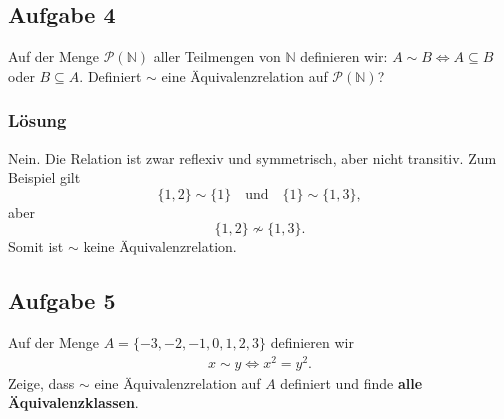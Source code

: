 \documentclass[a4paper,10pt]{article}
\newcommand{\N}{\mathbb{N}}
\newcommand{\s}[1]{#1}
\begin{document}
\subsection*{Aufgabe 4}

Auf der Menge $\mathcal{P}(\N)$ aller Teilmengen von $\N$ definieren wir: $A\sim B\iff A\subseteq B$ oder $B\subseteq A$. Definiert $\sim$ eine Äquivalenzrelation auf $\mathcal{P}(\N)$?

\s{\subsubsection*{Lösung}
    Nein. Die Relation ist zwar reflexiv und symmetrisch, aber nicht transitiv.
    Zum Beispiel gilt
    \[
    \{1,2\}\sim\{1\}
    \quad\text{und}\quad
    \{1\}\sim\{1,3\},
    \]
    aber
    \[
    \{1,2\}\not\sim\{1,3\}.
    \]
    Somit ist $\sim$ keine Äquivalenzrelation.
 }   

  
\subsection*{Aufgabe 5}
Auf der Menge $A=\{-3,-2,-1,0,1,2,3\}$ definieren wir
\begin{align*}
    x\sim y \iff x^2=y^2.
\end{align*}
Zeige, dass $\sim$ eine Äquivalenzrelation auf $A$ definiert und finde \textbf{alle Äquivalenzklassen}.
\end{document}
